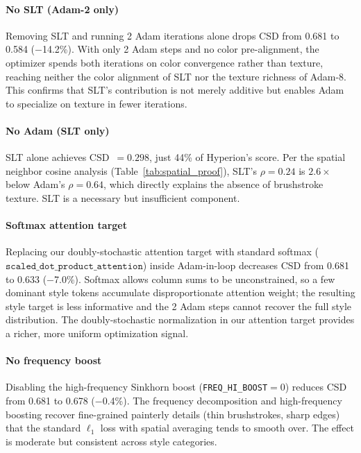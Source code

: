 \paragraph{No SLT (Adam-2 only)}
Removing SLT and running 2 Adam iterations alone drops CSD from 0.681 to 0.584
($-$14.2\%).
With only 2 Adam steps and no color pre-alignment, the optimizer spends both
iterations on color convergence rather than texture, reaching neither the color
alignment of SLT nor the texture richness of Adam-8.
This confirms that SLT's contribution is not merely additive but enables Adam
to specialize on texture in fewer iterations.

\paragraph{No Adam (SLT only)}
SLT alone achieves CSD~$= 0.298$, just 44\% of Hyperion's score.
Per the spatial neighbor cosine analysis (Table~\ref{tab:spatial_proof}),
SLT's $\rho = 0.24$ is $2.6\times$ below Adam's $\rho = 0.64$, which
directly explains the absence of brushstroke texture.
SLT is a necessary but insufficient component.

\paragraph{Softmax attention target}
Replacing our doubly-stochastic attention target with standard softmax
($\texttt{scaled\_dot\_product\_attention}$) inside Adam-in-loop
decreases CSD from 0.681 to 0.633 ($-$7.0\%).
Softmax allows column sums to be unconstrained, so a few dominant style tokens
accumulate disproportionate attention weight; the resulting style target is less
informative and the 2 Adam steps cannot recover the full style distribution.
The doubly-stochastic normalization in our attention target provides a richer,
more uniform optimization signal.

\paragraph{No frequency boost}
\label{sec:ablation:freq}
Disabling the high-frequency Sinkhorn boost (\texttt{FREQ\_HI\_BOOST}$=0$)
reduces CSD from 0.681 to 0.678 ($-$0.4\%).
The frequency decomposition and high-frequency boosting recover fine-grained
painterly details (thin brushstrokes, sharp edges) that the standard $\ell_1$
loss with spatial averaging tends to smooth over.
The effect is moderate but consistent across style categories.

